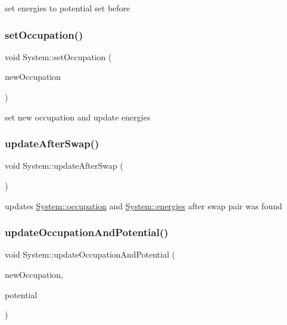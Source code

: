 set energies to potential set before \mbox{\label{classSystem_ac449110fcd692cdec9987730635179df}} 
\subsubsection{\texorpdfstring{set\+Occupation()}{setOccupation()}}
{\footnotesize\ttfamily void System\+::set\+Occupation (\begin{DoxyParamCaption}\item[{std\+::vector$<$ bool $>$ const \&}]{new\+Occupation }\end{DoxyParamCaption})\hspace{0.3cm}{\ttfamily [private]}}

set new occupation and update energies \mbox{\label{classSystem_ad32d6fd369f822d075e19698f8e6a2ae}} 
\subsubsection{\texorpdfstring{update\+After\+Swap()}{updateAfterSwap()}}
{\footnotesize\ttfamily void System\+::update\+After\+Swap (\begin{DoxyParamCaption}{ }\end{DoxyParamCaption})\hspace{0.3cm}{\ttfamily [private]}}

updates \hyperlink{classSystem_af13aaae75d6cff51d202b004a9fdc3d4}{System\+::occupation} and \hyperlink{classSystem_aee5f3f70dcfa30875997d09e2a077dce}{System\+::energies} after swap pair was found \mbox{\label{classSystem_adabb9bdb6516b565f63345ea74a10de7}} 
\subsubsection{\texorpdfstring{update\+Occupation\+And\+Potential()}{updateOccupationAndPotential()}}
{\footnotesize\ttfamily void System\+::update\+Occupation\+And\+Potential (\begin{DoxyParamCaption}\item[{std\+::vector$<$ bool $>$ const \&}]{new\+Occupation,  }\item[{mfem\+::\+Grid\+Function const \&}]{potential }\end{DoxyParamCaption})}

